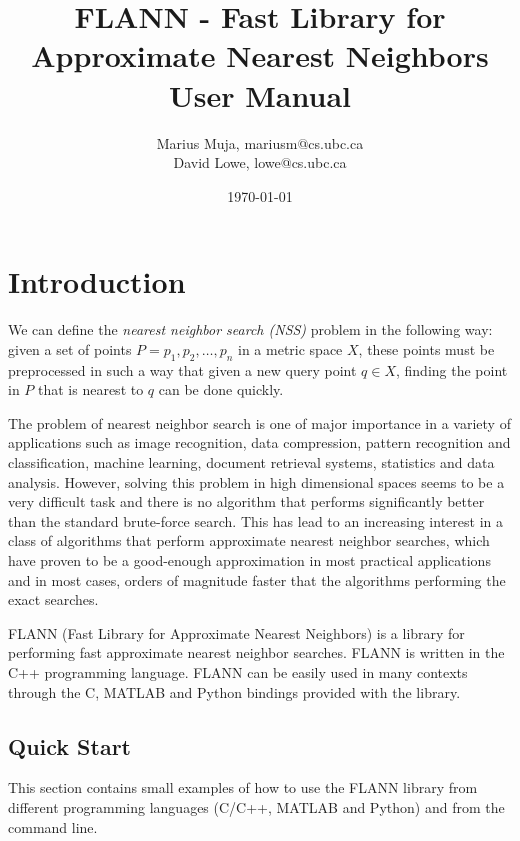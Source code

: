 \documentclass[letter,10pt]{article}
\title{FLANN - Fast Library for Approximate Nearest Neighbors\\[0.5cm] User
Manual\\[1cm]}
\author{Marius Muja, mariusm@cs.ubc.ca\\David Lowe, lowe@cs.ubc.ca}
\date{\today}
\begin{document}
 \begin{titlepage}
\vspace{10cm}
\maketitle
\thispagestyle{empty}
 \end{titlepage}


\section{Introduction}

We can define the \emph{nearest neighbor search (NSS)} problem in the
following way: given a set of points $P=p_1,p_2,\dots,p_n$ in a metric
space $X$, these points must be preprocessed in such a way that given a new
query point $q \in X$, finding the point in $P$ that is nearest to $q$ can
be done quickly.

The problem of nearest neighbor search is one of major importance in a
variety of applications such as image recognition, data compression,
pattern recognition and classification, machine learning,  document
retrieval systems, statistics and data analysis. However, solving this
problem in high dimensional spaces seems to be a very difficult task and
there is no algorithm that performs significantly better than the standard
brute-force search. This has lead to an increasing interest in a class of
algorithms that perform approximate nearest neighbor searches, which have
proven to be a good-enough approximation in most practical applications and
in most cases, orders of magnitude faster that the algorithms performing
the exact searches.

FLANN (Fast Library for Approximate Nearest Neighbors) is a library for
performing fast approximate nearest neighbor searches. FLANN is written in
the C++ programming language. FLANN can be easily used in many contexts
through the C, MATLAB and Python bindings provided with the library.



\subsection{Quick Start}
\label{sec:quickstart}


This section contains small examples of how to use the FLANN library from
different programming languages (C/C++, MATLAB and Python) and from the
command line.
\end{document}
